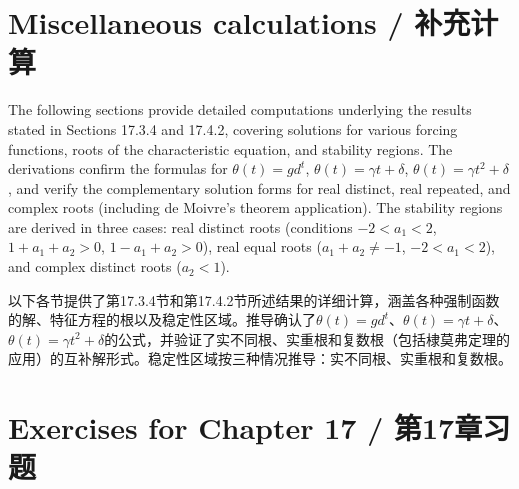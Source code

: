\section{Miscellaneous calculations / 补充计算}

\begin{original}
The following sections provide detailed computations underlying the results stated in Sections 17.3.4 and 17.4.2, covering solutions for various forcing functions, roots of the characteristic equation, and stability regions. The derivations confirm the formulas for $\theta(t) = gd^t$, $\theta(t) = \gamma t + \delta$, $\theta(t) = \gamma t^2 + \delta$, and verify the complementary solution forms for real distinct, real repeated, and complex roots (including de Moivre's theorem application). The stability regions are derived in three cases: real distinct roots (conditions $-2 < a_1 < 2$, $1 + a_1 + a_2 > 0$, $1 - a_1 + a_2 > 0$), real equal roots ($a_1 + a_2 \neq -1$, $-2 < a_1 < 2$), and complex distinct roots ($a_2 < 1$).
\end{original}
\begin{translation}
以下各节提供了第17.3.4节和第17.4.2节所述结果的详细计算，涵盖各种强制函数的解、特征方程的根以及稳定性区域。推导确认了$\theta(t) = gd^t$、$\theta(t) = \gamma t + \delta$、$\theta(t) = \gamma t^2 + \delta$的公式，并验证了实不同根、实重根和复数根（包括棣莫弗定理的应用）的互补解形式。稳定性区域按三种情况推导：实不同根、实重根和复数根。
\end{translation}
\section*{Exercises for Chapter 17 / 第17章习题}

